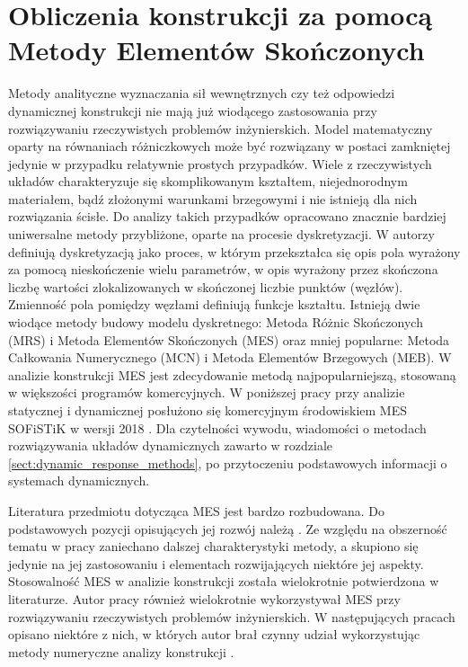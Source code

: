 \section{Obliczenia konstrukcji za pomocą Metody Elementów Skończonych} \label{sect:MES}
Metody analityczne wyznaczania sił wewnętrznych czy też odpowiedzi dynamicznej konstrukcji nie mają już wiodącego zastosowania przy rozwiązywaniu rzeczywistych problemów inżynierskich. Model matematyczny oparty na równaniach różniczkowych może być rozwiązany w postaci zamkniętej jedynie w przypadku relatywnie prostych przypadków. Wiele z rzeczywistych układów charakteryzuje się skomplikowanym kształtem, niejednorodnym materiałem, bądź złożonymi warunkami brzegowymi i nie istnieją dla nich rozwiązania ścisłe. Do analizy takich przypadków opracowano znacznie bardziej uniwersalne metody przybliżone, oparte na procesie dyskretyzacji. W \cite{Rakowski2016} autorzy definiują dyskretyzacją jako proces, w którym przekształca się opis pola wyrażony za pomocą nieskończenie wielu parametrów, w opis wyrażony przez skończona liczbę wartości zlokalizowanych w skończonej liczbie punktów (węzłów). Zmienność pola pomiędzy węzłami definiują funkcje kształtu. Istnieją dwie wiodące metody budowy modelu dyskretnego: Metoda Różnic Skończonych (MRS) i Metoda Elementów Skończonych (MES) oraz mniej popularne: Metoda Całkowania Numerycznego (MCN) i Metoda Elementów Brzegowych (MEB). W analizie konstrukcji MES jest zdecydowanie metodą najpopularniejszą, stosowaną w większości programów komercyjnych. W poniższej pracy przy analizie statycznej i dynamicznej posłużono się komercyjnym środowiskiem MES SOFiSTiK w wersji 2018 \cite{SOFISTIK2018,Hartmann2007}. Dla czytelności wywodu, wiadomości o metodach rozwiązywania układów dynamicznych zawarto w rozdziale \ref{sect:dynamic_response_methods}, po przytoczeniu podstawowych informacji o systemach dynamicznych. 

Literatura przedmiotu dotycząca MES jest bardzo rozbudowana. Do podstawowych pozycji opisujących jej rozwój należą \parencite{Kleiber1985,Hughes1987,Zienkiewicz2005,Rakowski2016,Langtangen2019}. Ze względu na obszerność tematu w pracy zaniechano dalszej charakterystyki metody, a skupiono się jedynie na jej zastosowaniu i elementach rozwijających niektóre jej aspekty. Stosowalność MES w analizie konstrukcji została wielokrotnie potwierdzona w literaturze. Autor pracy również wielokrotnie wykorzystywał MES przy rozwiązywaniu rzeczywistych problemów inżynierskich. W następujących pracach opisano niektóre z nich, w których autor brał czynny udział wykorzystując metody numeryczne analizy konstrukcji \parencite{Zotowski2016d,Zotowski2017a,Cudny2017,Zotowski2017h,Zotowski2018a,Zotowski2018d,Zotowski2018c,Binczyk2020a}.

